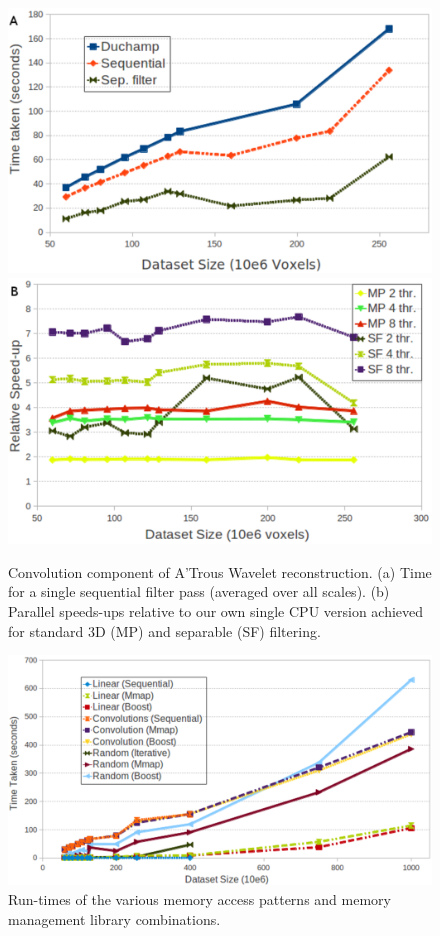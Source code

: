 \begin{figure}[ht]
  \centering
  \includegraphics[scale=0.385]{part2/Badenhorst_O01/O01_f1}
  \includegraphics[scale=0.385]{part2/Badenhorst_O01/O01_f2}
  \caption{Convolution component of A'Trous Wavelet reconstruction.  (a) Time for a single sequential filter pass (averaged over all scales).  (b) Parallel speeds-ups relative to our own single CPU version achieved for standard 3D (MP) and separable (SF) filtering.}
  \label{fig:H2}
\end{figure}



\begin{figure}[ht]
  \centering
  \includegraphics[scale=0.55]{part2/Badenhorst_O01/O01_f3}
  \caption{Run-times of the various memory access patterns and  memory management library combinations.} 
  \label{fig:H3}
\end{figure}


